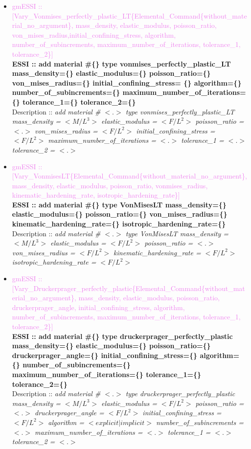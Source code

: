 \documentclass[11pt]{article}
\begin{document}
\begin{itemize}
    \item \textcolor{violet}{gmESSI :: [Vary\_Vonmises\_perfectly\_plastic\_LT\{Elemental\_Command\{without\_material\_no\_argument\}, mass\_density, elastic\_modulus, poisson\_ratio, von\_mises\_radius,initial\_confining\_stress, algorithm, number\_of\_subincrements, maximum\_number\_of\_iterations, tolerance\_1, tolerance\_2\}]}\\
    \textbf{ESSI :: add material \#\{\} type vonmises\_perfectly\_plastic\_LT mass\_density=\{\} elastic\_modulus=\{\} poisson\_ratio=\{\}  von\_mises\_radius=\{\} initial\_confining\_stress= \{\} algorithm=\{\} number\_of\_subincrements=\{\} maximum\_number\_of\_iterations=\{\} tolerance\_1=\{\} tolerance\_2=\{\}}\\
    Description ::  \textit{ add material \# $<.>$ type vonmises\_perfectly\_plastic\_LT mass\_density = $<M/L^3>$ elastic\_modulus = $<F/L^2>$ poisson\_ratio = $<.>$ von\_mises\_radius = $<F/L^2>$ initial\_confining\_stress = $<F/L^2>$  maximum\_number\_of\_iterations = $<.>$ tolerance\_1 = $<.>$ tolerance\_2 = $<.>$} 

    \item \textcolor{violet}{gmESSI :: [Vary\_VonmisesLT\{Elemental\_Command\{without\_material\_no\_argument\}, mass\_density, elastic\_modulus, poisson\_ratio, vonmises\_radius, kinematic\_hardening\_rate, isotropic\_hardening\_rate\}]}\\
    \textbf{ESSI :: add material \#\{\} type VonMisesLT mass\_density=\{\} elastic\_modulus=\{\}  poisson\_ratio=\{\} von\_mises\_radius=\{\} kinematic\_hardening\_rate=\{\} isotropic\_hardening\_rate=\{\}}\\
    Description ::  \textit{ add material \# $<.>$ type VonMisesLT  mass\_density = $<M/L^3>$ elastic\_modulus = $<F/L^2>$  poisson\_ratio = $<.>$ von\_mises\_radius = $<F/L^2>$ kinematic\_hardening\_rate = $<F/L^2>$ isotropic\_hardening\_rate = $<F/L^2>$} 

    \item \textcolor{violet}{gmESSI :: [Vary\_Druckerprager\_perfectly\_plastic\{Elemental\_Command\{without\_material\_no\_argument\}, mass\_density, elastic\_modulus, poisson\_ratio, druckerprager\_angle, initial\_confining\_stress, algorithm, number\_of\_subincrements, maximum\_number\_of\_iterations, tolerance\_1, tolerance\_2\}]}\\
    \textbf{ESSI :: add material \#\{\} type druckerprager\_perfectly\_plastic mass\_density=\{\} elastic\_modulus=\{\} poisson\_ratio=\{\} druckerprager\_angle=\{\} initial\_confining\_stress=\{\} algorithm=\{\} number\_of\_subincrements=\{\} maximum\_number\_of\_iterations=\{\} tolerance\_1=\{\} tolerance\_2=\{\}}\\
    Description ::  \textit{ add material \# $<.>$ type druckerprager\_perfectly\_plastic  mass\_density = $<M/L^3>$ elastic\_modulus = $<F/L^2>$  poisson\_ratio = $<.>$ druckerprager\_angle = $<F/L^2>$ initial\_confining\_stress = $<F/L^2>$ algorithm = $<explicit|implicit>$  number\_of\_subincrements = $<.>$ maximum\_number\_of\_iterations = $<.>$ tolerance\_1 = $<.>$ tolerance\_2 = $<.>$} 


\end{itemize}
\end{document}
